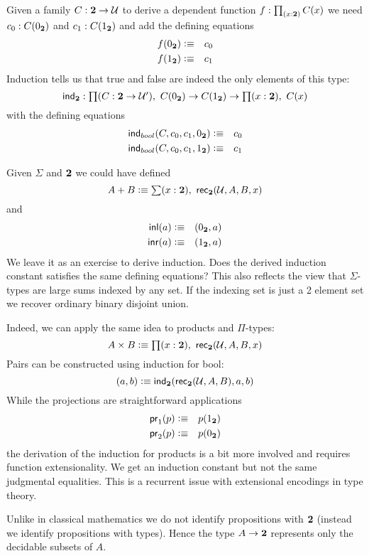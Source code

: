 Given a family $C : \mathbf{2} \to \mathcal{U}$ to derive a dependent function 
$f : \prd{x:\bool}C(x)$ we need $c_0:C({0_{\mathbf{2}}})$ and $c_1 : C({1_{\mathbf{2}}})$ and
add the defining equations
\begin{eqnarray*}
  f({0_{\mathbf{2}}}) & \vcentcolon\equiv & c_0 \\
  f({1_{\mathbf{2}}}) & \vcentcolon\equiv & c_1
\end{eqnarray*}
Induction tells us that true and false are indeed the only
elements of this type:
\[ \ind{\bool} : \prd{C:\bool \to \UU'}  C(\bfalse) \to C(\btrue)
\to \prd{x:\bool} C(x) \]
with the defining equations
\begin{eqnarray*}
  \mathsf{ind}_{bool}(C,c_0,c_1,{0_{\mathbf{2}}}) & \vcentcolon\equiv & c_0 \\
  \mathsf{ind}_{bool}(C,c_0,c_1,{1_{\mathbf{2}}}) & \vcentcolon\equiv & c_1
\end{eqnarray*}

Given $\Sigma$ and $\mathbf{2}$ we could have defined
\[ A + B \defeq \sm{x:\bool} \rec{\bool}(\UU,A,B,x) \]
and
\begin{eqnarray*}
  {\mathsf{inl}}(a) & \vcentcolon\equiv & ( {0_{\mathbf{2}}},a) \\
  {\mathsf{inr}}(a) & \vcentcolon\equiv & ( {1_{\mathbf{2}}},a)
\end{eqnarray*}
We leave it as an exercise to derive induction. Does the derived
induction constant satisfies the same defining equations?
This also reflects the view that $\Sigma$-types are large sums 
indexed by any set. If the indexing set is just a 2 element set we
recover ordinary binary disjoint union.

Indeed, we can apply the same idea to products and $\Pi$-types:
\[ A \times B \defeq \prd{x:\bool}\rec{\bool}(\UU,A,B,x) \]
Pairs can be constructed using induction for bool:
\[ ( a,b) \vcentcolon\equiv \mathsf{ind}_{\mathbf{2}}(\mathsf{rec}_{\mathbf{2}}(\mathcal{U},A,B),a,b) \]
While the projections are straightforward applications
\begin{eqnarray*}
  \mathsf{pr}_{1}(p) & \vcentcolon\equiv & p({1_{\mathbf{2}}}) \\
  \mathsf{pr}_{2}(p) & \vcentcolon\equiv & p({0_{\mathbf{2}}}) \\
\end{eqnarray*}
the derivation of the induction for products is a bit more
involved and requires function extensionality. We get an
induction constant but not the same judgmental equalities.
This is a recurrent issue with extensional encodings in type
theory. 

Unlike in classical mathematics we
do not identify propositions with $\mathbf{2}$ (instead we identify
propositions with types). Hence the type $A \to \mathbf{2}$ 
represents only the decidable subsets of $A$.

